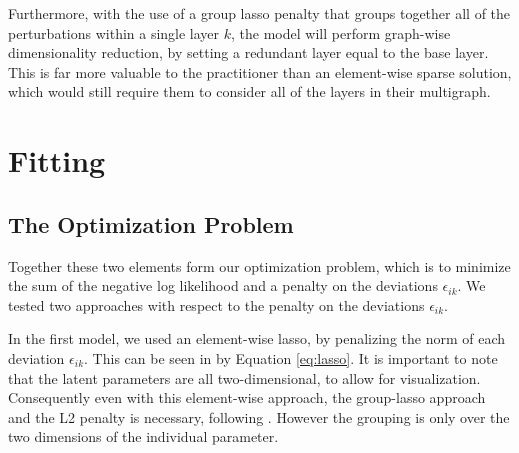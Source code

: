 \documentclass{article}
\begin{document}
Furthermore, with the use of a group lasso penalty that groups together all of the perturbations within a single layer $k$, the model will perform graph-wise dimensionality reduction, by setting a redundant layer equal to the base layer. This is far more valuable to the practitioner than an element-wise sparse solution, which would still require them to consider all of the layers in their multigraph. %






\section{Fitting}
\subsection{The Optimization Problem}

Together these two elements form our optimization problem, which is to minimize the sum of the negative log likelihood and a penalty on the deviations $\epsilon_{ik}$. We tested two approaches with respect to the penalty on the deviations $\epsilon_{ik}$. 

In the first model, we used an element-wise lasso, by penalizing the norm of each deviation $\epsilon_{ik}$. This can be seen in by Equation \ref{eq:lasso}. It is important to note that the latent parameters are all two-dimensional, to allow for visualization. Consequently even with this element-wise approach, the group-lasso approach and the L2 penalty is necessary, following \cite{Yuan2008}. However the grouping is only over the two dimensions of the individual parameter.  
\end{document}
